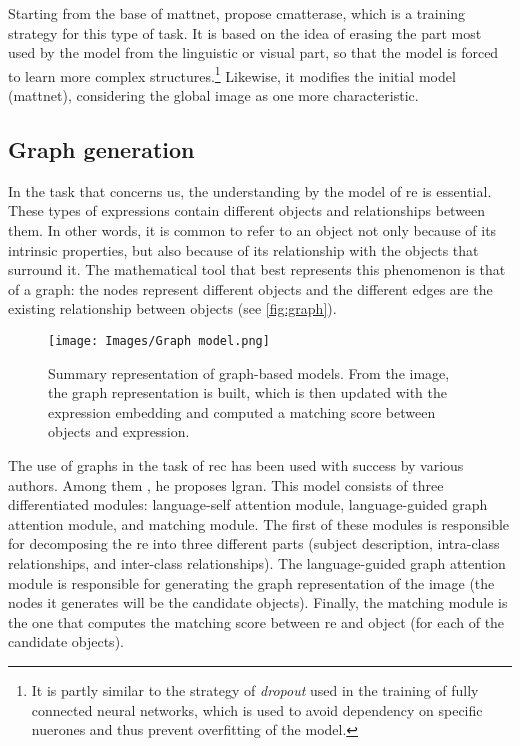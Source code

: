 Starting from the base of \gls{mattnet},
 propose
\gls{cmatterase}, which is a training strategy for this type of task. It is
based on the idea of erasing the part most used by the model from the
linguistic or visual part, so that the model is forced to learn more complex
structures.\footnote{It is partly similar to the strategy of \emph{dropout}
  used in the training of fully connected neural networks, which is used to
  avoid dependency on specific nuerones and thus prevent overfitting of the
  model.} Likewise, it modifies the initial model (\gls{mattnet}), considering
the global image as one more characteristic.

\subsection{Graph generation} \label{sec:graph}
In the task that concerns us, the understanding by the model of \gls{re} is
essential. These types of expressions contain different objects and
relationships between them. In other words, it is common to refer to an object
not only because of its intrinsic properties, but also because of its
relationship with the objects that surround it. The mathematical tool that best
represents this phenomenon is that of a graph: the nodes represent different
objects and the different edges are the existing relationship between objects
(see \vref{fig:graph}).

\begin{figure}[ht]
  \centering
  \texttt{[image: Images/Graph model.png]}
  \caption[Graph based model representation]{Summary representation of
    graph-based models. From the image, the graph representation is built,
    which is then updated with the expression embedding and computed a matching
    score between objects and expression.}
  \label{fig:graph}
\end{figure}

The use of graphs in the task of \gls{rec} has been used with success by
various authors. Among them , he proposes
\gls{lgran}. This model consists of three differentiated modules: language-self
attention module, language-guided graph attention module, and matching
module. The first of these modules is responsible for decomposing the \gls{re}
into three different parts (subject description, intra-class relationships, and
inter-class relationships). The language-guided graph attention module is
responsible for generating the graph representation of the image (the nodes it
generates will be the candidate objects). Finally, the matching module is the
one that computes the matching score between \gls{re} and object (for each of
the candidate objects).


